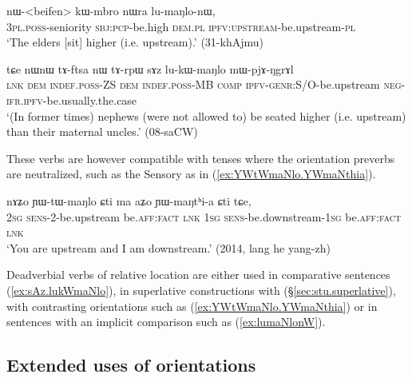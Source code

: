 \begin{exe}
\ex \label{ex:lumaNlonW}
\gll  nɯ-<beifen> kɯ-mbro nɯra lu-maŋlo-nɯ, \\
\textsc{3pl}.\textsc{poss}-seniority \textsc{sbj}:\textsc{pcp}-be.high \textsc{dem}.\textsc{pl} \textsc{ipfv}:\textsc{upstream}-be.upstream-\textsc{pl} \\
\glt `The elders [sit] higher (i.e. upstream).' (31-khAjmu) 
\end{exe}

\begin{exe}
\ex \label{ex:sAz.lukWmaNlo}
\gll  tɕe nɯnɯ tɤ-ftsa nɯ tɤ-rpɯ sɤz lu-kɯ-maŋlo mɯ-pjɤ-ŋgrɤl \\
\textsc{lnk} \textsc{dem} \textsc{indef}.\textsc{poss}-ZS \textsc{dem} \textsc{indef}.\textsc{poss}-MB \textsc{comp} \textsc{ipfv}-\textsc{genr}:S/O-be.upstream \textsc{neg}-\textsc{ifr}.\textsc{ipfv}-be.usually.the.case \\
\glt `(In former times) nephews (were not allowed to) be seated higher (i.e. upstream) than their maternal uncles.' (08-saCW) 
\end{exe}

These verbs are however compatible with tenses where the orientation preverbs are neutralized, such as the Sensory  as in (\ref{ex:YWtWmaNlo.YWmaNthia}).

\begin{exe}
\ex \label{ex:YWtWmaNlo.YWmaNthia}
\gll  nɤʑo ɲɯ-tɯ-maŋlo ɕti ma aʑo ɲɯ-maŋtʰi-a ɕti tɕe, \\
\textsc{2sg} \textsc{sens}-2-be.upstream be.\textsc{aff}:\textsc{fact} \textsc{lnk} \textsc{1sg} \textsc{sens}-be.downstream-\textsc{1sg} be.\textsc{aff}:\textsc{fact} \textsc{lnk} \\
\glt `You are upstream and I am downstream.' (2014, lang he yang-zh)
\end{exe}

Deadverbial verbs of relative location are either used in comparative sentences (\ref{ex:sAz.lukWmaNlo}), in superlative constructions with  (§\ref{sec:stu.superlative}), with contrasting orientations such as (\ref{ex:YWtWmaNlo.YWmaNthia})  or in sentences with an implicit comparison such as (\ref{ex:lumaNlonW}). 


\subsection{Extended uses of orientations} \label{sec:orientation.extended}

